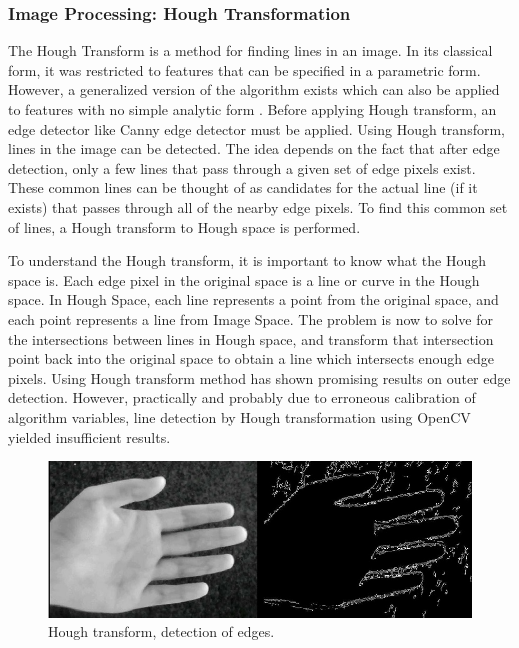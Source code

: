 \subsubsection{Image Processing: Hough Transformation}

The Hough Transform is a method for finding lines in an image. In its classical form, it was restricted to features that can be specified in a parametric form. However, a generalized version of the algorithm exists which can also be applied to features with no simple analytic form \parencite{hough}. Before applying Hough transform, an edge detector like Canny edge detector must be applied. Using Hough transform, lines in the image can be detected. The idea depends on the fact that after edge detection, only a few lines that pass through a given set of edge pixels exist. These common lines can be thought of as candidates for the actual line (if it exists) that passes through all of the nearby edge pixels. To find this common set of lines, a Hough transform to Hough space is performed. 

To understand the Hough transform, it is important to know what the Hough space is. Each edge pixel in the original space is a line or curve in the Hough space. In Hough Space, each line represents a point from the original space, and each point represents a line from Image Space. The problem is now to solve for the intersections between lines in Hough space, and transform that intersection point back into the original space to obtain a line which intersects enough edge pixels. 
Using Hough transform method has shown promising results on outer edge detection. However, practically and probably due to erroneous calibration of algorithm variables, line detection by Hough transformation using OpenCV yielded insufficient results.


\begin{figure}[H]
\centering
\includegraphics[scale=0.7]{figures/compare6.JPG}
\caption[Hough transform, detection of edges]{Hough transform, detection of edges.}\label{fig:Compare6}
\end{figure}


